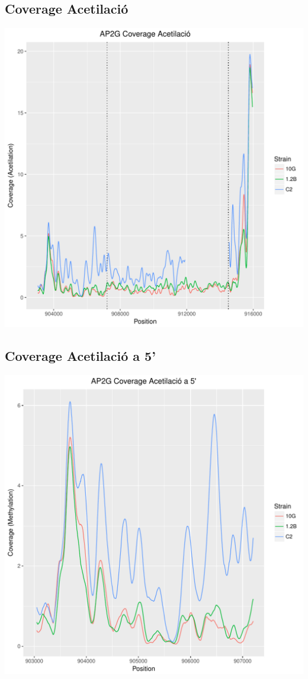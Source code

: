\documentclass{article}\usepackage[]{graphicx}\usepackage[]{color}
\newenvironment{knitrout}{}{} %
\begin{document}
\subsection{Coverage Acetilació}
\begin{knitrout}
\color{fgcolor}
\includegraphics[width=1\linewidth]{figure/plot_ac-1} 

\end{knitrout}
\clearpage
\subsection{Coverage Acetilació a 5'}
\begin{knitrout}
\color{fgcolor}
\includegraphics[width=1\linewidth]{figure/plot_ac_5-1} 

\end{knitrout}
\clearpage
\end{document}
